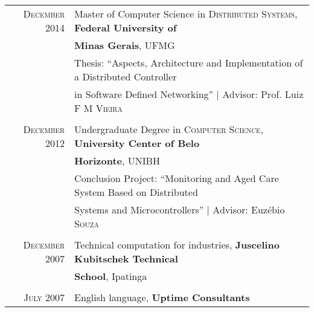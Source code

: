 \documentclass[a4paper,10pt]{article} %
\begin{document}
\begin{tabular}{rl}	
\textsc{December} 2014 & Master of Computer Science in 
\textsc{Distributed Systems},  \textbf{Federal University of}
\\ & \textbf{Minas Gerais}, UFMG \\
& Thesis: ``Aspects, Architecture and Implementation of a Distributed
Controller \\ & in Software Defined Networking'' 
| \small Advisor: Prof. Luiz \textsc{F M Vieira} \\ 
&\\


\textsc{December} 2012& Undergraduate Degree in 
\textsc{}\textsc{Computer Science},
\normalsize\textbf{ University Center of Belo} 
\\ & \textbf{Horizonte}, UNIBH \\
& Conclusion Project: ``Monitoring and Aged Care System Based on 
Distributed
\\ & Systems and Microcontrollers'' 
| \small Advisor: Euzébio \textsc{Souza} \\
&\\


\textsc{December} 2007 &Technical computation for industries, 
\textbf{Juscelino Kubitschek Technical}
\\ & \textbf{School}, Ipatinga \\
&\\


\textsc{July} 2007 & English language, \textbf{Uptime Consultants}
\end{tabular}
\end{document}
